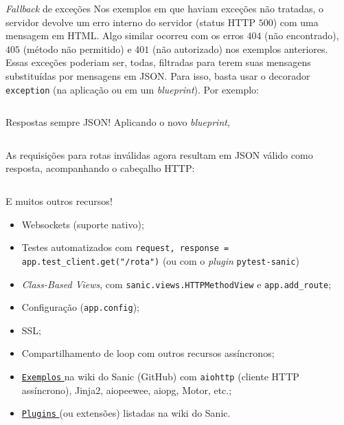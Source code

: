 \documentclass[utf8]{beamer}
\begin{document}
\begin{frame}[fragile]{\emph{Fallback} de exceções}
  Nos exemplos em que haviam exceções não tratadas,
  o servidor devolve um erro interno do servidor
  (status HTTP $500$) com uma mensagem em HTML.
  Algo similar ocorreu com os erros $404$ (não encontrado),
  $405$ (método não permitido) e $401$ (não autorizado)
  nos exemplos anteriores.
  Essas exceções poderiam ser, todas, filtradas para terem
  suas mensagens substituídas por mensagens em JSON.
  Para isso, basta usar o decorador \texttt{exception}
  (na aplicação ou em um \emph{blueprint}).
  Por exemplo:
  \inputminted{python}{exc10.py}
\end{frame}


\begin{frame}[fragile]{Respostas sempre JSON!}
  Aplicando o novo \emph{blueprint},
  \inputminted{python}{10_json_only.py}
  \vfill
  As requisições para rotas inválidas
  agora resultam em JSON válido como resposta,
  acompanhando o cabeçalho HTTP:
  \inputminted{raw}{10_responses.txt}
\end{frame}


\begin{frame}{E muitos outros recursos!}
  \begin{itemize}
    \item Websockets (suporte nativo);
    \item Testes automatizados com
      \texttt
                 {request, response = app.test_client.get("/rota")}
      (ou com o \emph{plugin} \texttt{pytest-sanic})
    \item \emph{Class-Based Views},
      com \texttt{sanic.views.HTTPMethodView}
      e \texttt{app.add_route};
    \item Configuração (\texttt{app.config});
    \item SSL;
    \item Compartilhamento de loop com outros recursos assíncronos;
    \item
      \href{https://github.com/channelcat/sanic/wiki/Examples}{%
        \nolinkurl{Exemplos}%
      } na wiki do Sanic (GitHub)
      com \texttt{aiohttp} (cliente HTTP assíncrono),
      Jinja2, aiopeewee, aiopg, Motor, etc.;
    \item
      \href{https://github.com/channelcat/sanic/wiki/Extensions}{%
        \nolinkurl{Plugins}%
      } (ou extensões) listadas na wiki do Sanic.
  \end{itemize}
\end{frame}
\end{document}
